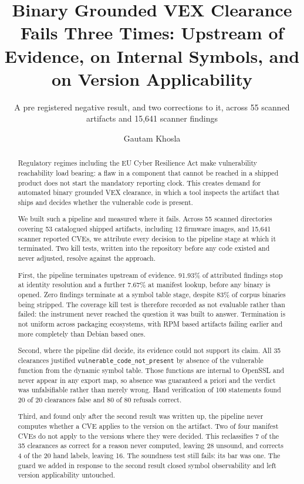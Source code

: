 \documentclass[sigconf,nonacm]{acmart}
\newcommand{\vcnp}{\texttt{vulnerable\_\-code\_\-not\_\-present}}
\begin{document}
\title{Binary Grounded VEX Clearance Fails Three Times: Upstream of Evidence, on
Internal Symbols, and on Version Applicability}
\subtitle{A pre registered negative result, and two corrections to it, across 55 scanned
artifacts and 15,641 scanner findings}

\author{Gautam Khosla}
\email{}

\begin{abstract}
Regulatory regimes including the EU Cyber Resilience Act make vulnerability
reachability load bearing: a flaw in a component that cannot be reached in a
shipped product does not start the mandatory reporting clock. This creates demand
for automated binary grounded VEX clearance, in which a tool inspects the
artifact that ships and decides whether the vulnerable code is present.

We built such a pipeline and measured where it fails. Across 55 scanned
directories covering 53 catalogued shipped artifacts, including 12 firmware
images, and 15,641 scanner reported CVEs, we attribute every decision to the
pipeline stage at which it terminated. Two kill tests, written into the
repository before any code existed and never adjusted, resolve against the
approach.

First, the pipeline terminates upstream of evidence. 91.93\% of attributed
findings stop at identity resolution and a further 7.67\% at manifest lookup,
before any binary is opened. Zero findings terminate at a symbol table stage,
despite 83\% of corpus binaries being stripped. The coverage kill test is
therefore recorded as not evaluable rather than failed: the instrument never
reached the question it was built to answer. Termination is not uniform across
packaging ecosystems, with RPM based artifacts failing earlier and more
completely than Debian based ones.

Second, where the pipeline did decide, its evidence could not support its claim.
All 35 clearances justified \vcnp{} by absence of
the vulnerable function from the dynamic symbol table. Those functions are
internal to OpenSSL and never appear in any export map, so absence was guaranteed
a priori and the verdict was unfalsifiable rather than merely wrong. Hand
verification of 100 statements found 20 of 20 clearances false and 80 of 80
refusals correct.

Third, and found only after the second result was written up, the pipeline never
computes whether a CVE applies to the version on the artifact. Two of four
manifest CVEs do not apply to the versions where they were decided. This
reclassifies 7 of the 35 clearances as correct for a reason never computed,
leaving 28 unsound, and corrects 4 of the 20 hand labels, leaving 16. The
soundness test still fails: its bar was one. The guard we added in response to
the second result closed symbol observability and left version applicability
untouched.


\end{abstract}
\end{document}

